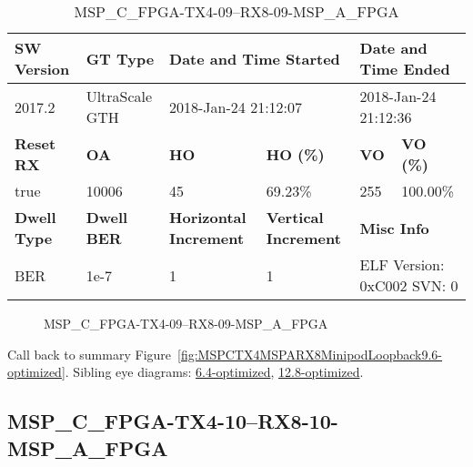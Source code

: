 \begin{table}[h]
\centering
\caption{MSP\_C\_FPGA-TX4-09--RX8-09-MSP\_A\_FPGA}
\label{tab:MSPCFPGATX409RX809MSPAFPGA9.6-optimized}
\begin{tabular}{@{}|l|l|l|l|l|l|@{}}
\toprule
\textbf{SW Version}                & \textbf{GT Type}   & \multicolumn{2}{l|}{\textbf{Date and Time Started}}            & \multicolumn{2}{l|}{\textbf{Date and Time Ended}}        \\ \midrule
2017.2                       & UltraScale GTH          & \multicolumn{2}{l|}{2018-Jan-24 21:12:07}                   & \multicolumn{2}{l|}{2018-Jan-24 21:12:36}               \\ \midrule
\textbf{Reset RX}                  & \textbf{OA} & \textbf{HO}   & \textbf{HO (\%)} & \textbf{VO} & \textbf{VO (\%)} \\ \midrule
true & 10006        & 45          & 69.23\%        & 255        & 100.00\%       \\ \midrule
\textbf{Dwell Type}                & \textbf{Dwell BER} & \textbf{Horizontal Increment} & \textbf{Vertical Increment}    & \multicolumn{2}{l|}{\textbf{Misc Info}}                  \\ \midrule
BER                            & 1e-7        & 1        & 1           & \multicolumn{2}{l|}{ELF Version: 0xC002 SVN: 0}                         \\ \bottomrule
\end{tabular}
\end{table}

\begin{figure}[h]
\caption{MSP\_C\_FPGA-TX4-09--RX8-09-MSP\_A\_FPGA} \label{fig:MSPCFPGATX409RX809MSPAFPGA9.6-optimized}
\end{figure}

Call back to summary Figure~\ref{fig:MSPCTX4MSPARX8MinipodLoopback9.6-optimized}.
Sibling eye diagrams: \hyperref[sec:MSPCFPGATX409RX809MSPAFPGA6.4-optimized]{6.4-optimized}, \hyperref[sec:MSPCFPGATX409RX809MSPAFPGA12.8-optimized]{12.8-optimized}.

\clearpage
\newpage


\subsection{MSP\_C\_FPGA-TX4-10--RX8-10-MSP\_A\_FPGA}\label{sec:MSPCFPGATX410RX810MSPAFPGA9.6-optimized}

